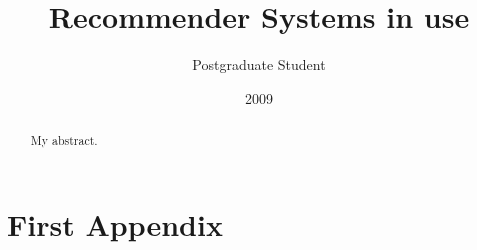 \documentclass[10pt, oneside]{report}
\title{Recommender Systems in use}
\author{Postgraduate Student}
\date{2009}
\begin{document}
\newcommand\todo[1]{\textcolor{red}{#1}\PackageWarning{TODO:}{#1!}}

\maketitle

\declaration

\dedication{To my ...}

\begin{abstract}
My abstract.
\end{abstract}

\tableofcontents

\chapter{}
\label{chap:chapter1}




\chapter{}


\chapter{}





\appendix

\chapter{First Appendix}
\end{document}
